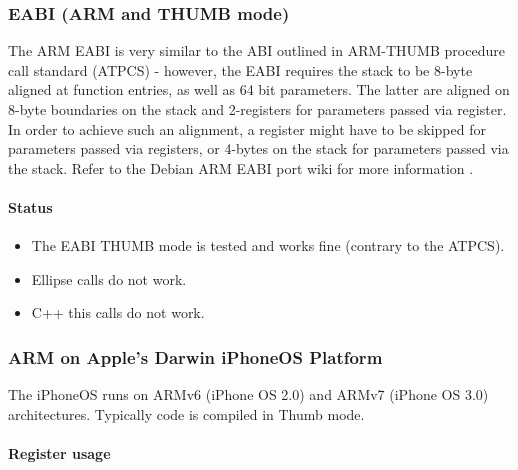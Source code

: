 \newpage

\subsubsection{EABI (ARM and THUMB mode)}


The ARM EABI is very similar to the ABI outlined in ARM-THUMB procedure call
standard (ATPCS) \cite{ATPCS} - however, the EABI requires the stack to be
8-byte aligned at function entries, as well as 64 bit parameters. The latter
are aligned on 8-byte boundaries on the stack and 2-registers for parameters
passed via register. In order to achieve such an alignment, a register might
have to be skipped for parameters passed via registers, or 4-bytes on the stack
for parameters passed via the stack. Refer to the Debian ARM EABI port wiki for more information \cite{armeabi}.


\paragraph{Status}

\begin{itemize}
\item The EABI THUMB mode is tested and works fine (contrary to the ATPCS).
\item Ellipse calls do not work.
\item C++ this calls do not work.
\end{itemize}

\newpage

\subsubsection{ARM on Apple's Darwin iPhoneOS Platform}


The iPhoneOS runs on ARMv6 (iPhone OS 2.0) and ARMv7 (iPhone OS 3.0) architectures.
Typically code is compiled in Thumb mode.

\paragraph{Register usage}

